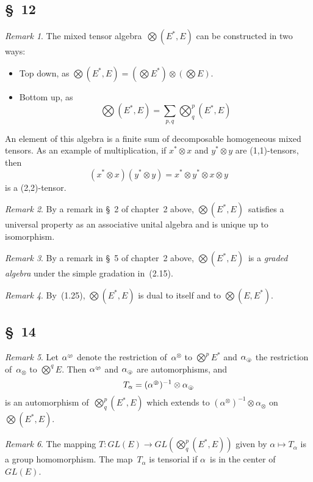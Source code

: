 \documentclass[letterpaper,12pt]{article}
\newcommand{\tprod}{\otimes}
\newcommand{\bigtprod}{\bigotimes}
\newcommand{\medtprod}{{\textstyle\bigtprod}}
\newcommand{\circled}[1]{\text{\tiny\textcircled{\textit{#1}}}}
\theoremstyle{definition}
\theoremstyle{remark}
\newtheorem*{rmk}{Remark}
\begin{document}
\subsection*{\S~12}
\begin{rmk}
The mixed tensor algebra~\(\medtprod(E^*,E)\) can be constructed in two ways:
\begin{itemize}
\item Top down, as \(\medtprod(E^*,E)=(\medtprod E^*)\tprod(\medtprod E)\).
\item Bottom up, as
\[\medtprod(E^*,E)=\sum_{p,q}\medtprod^p_q(E^*,E)\]
\end{itemize}
An element of this algebra is a finite sum of decomposable homogeneous mixed tensors. As an example of multiplication, if \(x^*\tprod x\) and \(y^*\tprod y\) are (1,1)-tensors, then
\[(x^*\tprod x)(y^*\tprod y)=x^*\tprod y^*\tprod x\tprod y\]
is a (2,2)-tensor.
\end{rmk}

\begin{rmk}
By a remark in \S~2 of chapter~2 above, \(\medtprod(E^*,E)\)~satisfies a universal property as an associative unital algebra and is unique up to isomorphism.
\end{rmk}

\begin{rmk}
By a remark in \S~5 of chapter~2 above, \(\medtprod(E^*,E)\)~is a \emph{graded algebra} under the simple gradation in~(2.15).
\end{rmk}

\begin{rmk}
By~(1.25), \(\medtprod(E^*,E)\) is dual to itself and to \(\medtprod(E,E^*)\).
\end{rmk}

\subsection*{\S~14}
\begin{rmk}
Let \(\alpha^{\circled{p}}\) denote the restriction of~\(\alpha^{\tprod}\) to \(\medtprod^p E^*\) and \(\alpha_{\circled{q}}\) the restriction of~\(\alpha_{\tprod}\) to \(\medtprod^q E\). Then \(\alpha^{\circled{p}}\) and \(\alpha_{\circled{q}}\) are automorphisms, and
\[T_{\alpha}=(\alpha^{\circled{p}})^{-1}\tprod\alpha_{\circled{q}}\]
is an automorphism of~\(\medtprod^p_q(E^*,E)\) which extends to \((\alpha^{\tprod})^{-1}\tprod\alpha_{\tprod}\) on~\(\medtprod(E^*,E)\).
\end{rmk}

\begin{rmk}
The mapping \(T:GL(E)\to GL(\medtprod^p_q(E^*,E))\) given by \(\alpha\mapsto T_{\alpha}\) is a group homomorphism. The map~\(T_{\alpha}\) is tensorial if \(\alpha\)~is in the center of~\(GL(E)\).
\end{rmk}
\end{document}
